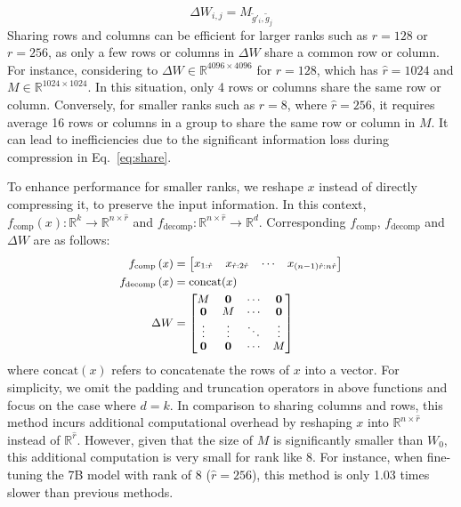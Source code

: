 \documentclass[11pt]{article}
\begin{document}
\begin{equation}
\Delta W_{i,j} = M_{\widetilde{g}'_i, \widetilde{g}_j}
\end{equation}
Sharing rows and columns can be efficient for larger ranks such as $r=128$ or $r=256$, as only a few rows or columns in $\Delta W$ share a common row or column.
For instance, considering to  $\Delta W \in \mathbb{R}^{4096 \times 4096}$ for $r=128$, which has $\hat{r}=1024$ and $M \in \mathbb{R}^{1024 \times 1024}$. In this situation, only 4 rows or columns share the same row or column.
Conversely, for smaller ranks such as $r=8$, where $\hat{r}=256$, it requires average 16 rows or columns in a group to share the same row or column in $M$.
It can lead to inefficiencies due to the significant information loss during compression in Eq.~\ref{eq:share}.

To enhance performance for smaller ranks, we reshape $x$ instead of directly compressing it, to preserve the input information. In this context, $f_\text{comp}\left(x\right) : \mathbb{R}^k \rightarrow \mathbb{R}^{n \times \hat{r}}$ and  $f_{\text{decomp}}: \mathbb{R}^{n \times \hat{r}} \rightarrow \mathbb{R}^{d}$.
Corresponding $f_\text{comp}$, $f_{\text{decomp}}$ and $\Delta W$ are as follows:
\begin{equation}
  \small
  \label{eq:decaq}
\begin{split}
f_\text{comp}\left(x\right) &= \begin{bmatrix} x_{1:\hat{r}} & x_{\hat{r}: 2\hat{r}} & \cdots  &x_{(n-1)\hat{r}: n\hat{r}}  \end{bmatrix}\\
f_{\text{decomp}}\left(x\right) &= \text{concat}(x)\\
\Delta W &= \begin{bmatrix}
M & \mathbf{0} & \cdots & \mathbf{0} \\
\mathbf{0} & M & \cdots & \mathbf{0} \\
\vdots & \vdots & \ddots & \vdots \\
\mathbf{0} & \mathbf{0} & \cdots & M
\end{bmatrix}
\end{split}
\end{equation}
where $\text{concat}(x)$ refers to concatenate the rows of $x$ into a vector.
For simplicity, we omit the padding and truncation operators in above functions and focus on the case where $d=k$. %
 In comparison to sharing columns and rows, this method incurs additional computational overhead by reshaping $x$ into $\mathbb{R}^{n \times \hat{r}}$ instead of $\mathbb{R}^{\hat{r}}$. However, given that the size of $M$ is significantly smaller than $W_0$, this additional computation is very small for rank like 8. For instance, when fine-tuning the 7B model with rank of 8 ($\hat{r}=256$), this method is only 1.03 times slower than previous methods.
\end{document}
